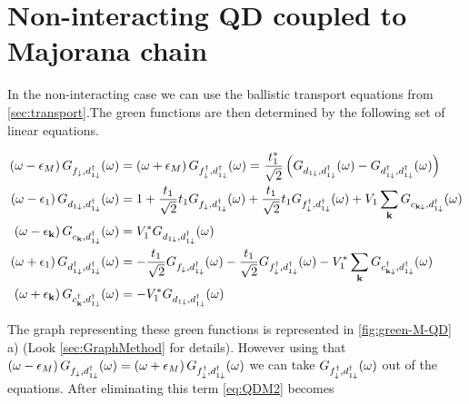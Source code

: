 \section{Non-interacting QD coupled to  Majorana chain \label{sec:GreenMaj-DQD}}

In the non-interacting case we can use the ballistic transport equations from \ref{sec:transport}.The green functions are then determined by the following set of linear equations. 




\begin{align}
    \left(\omega-\epsilon_{M}\right)G_{f_{\downarrow},d_{1\downarrow}^{\dagger}}(\omega)&=\left(\omega+\epsilon_{M}\right)G_{f_{\downarrow}^{\dagger},d_{1\downarrow}^{\dagger}}(\omega)=\frac{t^*_1}{\sqrt{2}}\left(G_{d_{1\downarrow},d_{1\downarrow}^{\dagger}}(\omega)-G_{d_{1\downarrow}^{\dagger},d_{1\downarrow}^{\dagger}}(\omega)\right) \label{eq:QDM1} \\ 
    \left(\omega-\epsilon_{1}\right)G_{d_{1\downarrow},d_{1\downarrow}^{\dagger}}(\omega)&=1+\frac{t_1}{\sqrt{2}}t_{1}G_{f_{\downarrow},d_{1\downarrow}^{\dagger}}(\omega)+\frac{t_1}{\sqrt{2}}t_{1}G_{f_{\downarrow}^{\dagger},d_{1\downarrow}^{\dagger}}(\omega)+V_{1}\sum_{\mathbf{k}}G_{c_{\mathbf{k\downarrow}},d_{1\downarrow}^{\dagger}}(\omega) \label{eq:QDM2} \\ 
    \left(\omega-\epsilon_{\mathbf{k}}\right)G_{c_{\mathbf{k}},d_{1\downarrow}^{\dagger}}(\omega)&=V_{1}^{*}G_{d_{1\downarrow},d_{1\downarrow}^{\dagger}}(\omega)\label{eq:QDM3} \\
    \left(\omega+\epsilon_{1}\right)G_{d_{1\downarrow}^{\dagger},d_{1\downarrow}^{\dagger}}(\omega)&=-\frac{t_1}{\sqrt{2}}G_{f_{\downarrow},d_{1\downarrow}^{\dagger}}(\omega)-\frac{t_1}{\sqrt{2}}G_{f_{\downarrow}^{\dagger},d_{1\downarrow}^{\dagger}}(\omega)-V_{1}^{*}\sum_{\mathbf{k}}G_{c_{\mathbf{k\downarrow}}^{\dagger},d_{1\downarrow}^{\dagger}}(\omega) \label{eq:QDM4} \\
    \left(\omega+\epsilon_{\mathbf{k}}\right)G_{c^\dagger_{\mathbf{k}},d_{1\downarrow}^{\dagger}}(\omega)&=-V_{1}^{*}G_{d_{1\downarrow},d_{1\downarrow}^{\dagger}}(\omega) \label{eq:QDM5}
\end{align}

The graph representing these green functions is represented in \ref{fig:green-M-QD} a)  (Look \ref{sec:GraphMethod} for details). However using that $\left(\omega-\epsilon_{M}\right)G_{f_{\downarrow},d_{1\downarrow}^{\dagger}}(\omega)=\left(\omega+\epsilon_{M}\right)G_{f_{\downarrow}^{\dagger},d_{1\downarrow}^{\dagger}}(\omega)$ we can take
 $G_{f_{\downarrow}^{\dagger},d_{1\downarrow}^{\dagger}}(\omega)$ out of the equations. After eliminating this term \ref{eq:QDM2} becomes
 
